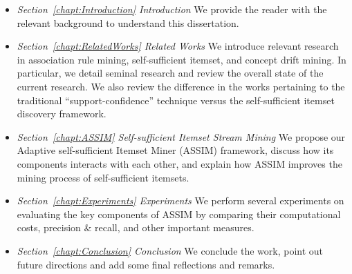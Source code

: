 \begin{itemize}
    
    \item \textit{Section~\ref{chapt:Introduction} Introduction}\newline
    We provide the reader with the relevant background to understand this dissertation.

    \item \textit{Section~\ref{chapt:RelatedWorks} Related Works}\newline
    We introduce relevant research in association rule mining, self-sufficient itemset, and concept drift mining. In particular, we detail seminal research and review the overall state of the current research. We also review the difference in the works pertaining to the traditional ``support-confidence'' technique versus the self-sufficient itemset discovery framework.
    
    \item \textit{Section~\ref{chapt:ASSIM} Self-sufficient Itemset Stream Mining}\newline
    We propose our Adaptive self-sufficient Itemset Miner (ASSIM) framework, discuss how its components interacts with each other, and explain how ASSIM improves the mining process of self-sufficient itemsets.
    
    \item \textit{Section~\ref{chapt:Experiments} Experiments}\newline
    We perform several experiments on evaluating the key components of ASSIM by comparing their computational costs, precision \& recall, and other important measures.
    
    \item \textit{Section~\ref{chapt:Conclusion} Conclusion}\newline
    We conclude the work, point out future directions and add some final reflections and remarks.
\end{itemize}

